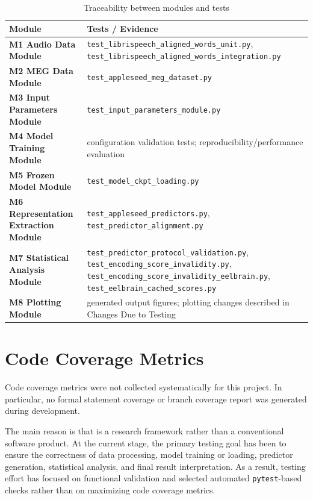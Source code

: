 \documentclass[12pt, titlepage]{article}
\begin{document}
\begin{table}[H]
\centering
\caption{Traceability between modules and tests}
\label{tab:trace_to_modules}
\begin{tabularx}{0.96\textwidth}{p{3.6cm}X}
\toprule
\textbf{Module} & \textbf{Tests / Evidence} \\
\midrule
\textbf{M1 Audio Data Module} & \texttt{test\_librispeech\_aligned\_words\_unit.py}, \texttt{test\_librispeech\_aligned\_words\_integration.py} \\
\textbf{M2 MEG Data Module} & \texttt{test\_appleseed\_meg\_dataset.py} \\
\textbf{M3 Input Parameters Module} & \texttt{test\_input\_parameters\_module.py} \\
\textbf{M4 Model Training Module} & configuration validation tests; reproducibility/performance evaluation \\
\textbf{M5 Frozen Model Module} & \texttt{test\_model\_ckpt\_loading.py} \\
\textbf{M6 Representation Extraction Module} & \texttt{test\_appleseed\_predictors.py}, \texttt{test\_predictor\_alignment.py} \\
\textbf{M7 Statistical Analysis Module} & \texttt{test\_predictor\_protocol\_validation.py}, \texttt{test\_encoding\_score\_invalidity.py}, \texttt{test\_encoding\_score\_invalidity\_eelbrain.py}, \texttt{test\_eelbrain\_cached\_scores.py} \\
\textbf{M8 Plotting Module} & generated output figures; plotting changes described in Changes Due to Testing \\
\bottomrule
\end{tabularx}
\end{table}






\section{Code Coverage Metrics}

Code coverage metrics were not collected systematically for this project.
In particular, no formal statement coverage or branch coverage report was generated during development.

The main reason is that \progname{} is a research framework rather than a conventional software product.
At the current stage, the primary testing goal has been to ensure the correctness of data processing, model training or loading, predictor generation, statistical analysis, and final result interpretation.
As a result, testing effort has focused on functional validation and selected automated \texttt{pytest}-based checks rather than on maximizing code coverage metrics.
\end{document}
